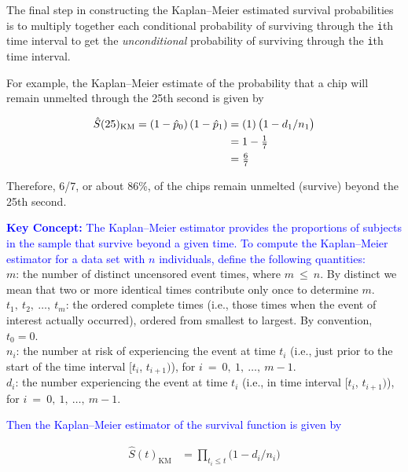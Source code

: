 \documentclass[
]{report}
\begin{document}
The final step in constructing the Kaplan--Meier estimated survival probabilities is to multiply together each conditional probability of surviving through the \texttt{i}th time interval to get the \emph{unconditional} probability of surviving through the \texttt{i}th time interval.

For example, the Kaplan--Meier estimate of the probability that a chip will remain unmelted through the 25th second is given by

\begin{align}
\hat S(25)_{\mathrm{KM}} = (1 - \hat p_0)\,(1 - \hat p_1) &= (1)\,\bigl(1 - d_1/n_1\bigr) \notag \\
&= 1 - \tfrac{1}{7} \notag \\ 
&= \tfrac{6}{7} \notag
\end{align}

Therefore, 6/7, or about 86\%, of the chips remain unmelted (survive) beyond the 25th second.

\textbf{\textcolor{blue}{Key Concept:}}
\textcolor{blue}{The Kaplan–Meier estimator provides the proportions of subjects in the sample that survive beyond a given time. To compute the Kaplan–Meier estimator for a data set with $n$ individuals, define the following quantities:}\\
\(\scriptstyle m\): the number of distinct uncensored event times, where \(\scriptstyle m \  \le \ n\). By distinct we mean that two or more identical times contribute only once to determine \(m\).\\
\(\scriptstyle t_1, \ t_2,\  \dots,\  t_m\): the ordered complete times (i.e., those times when the event of interest actually occurred), ordered from smallest to largest. By convention, \(t_0 = 0\).\\
\(\scriptstyle n_i\): the number at risk of experiencing the event at time \(\scriptstyle t_i\) (i.e., just prior to the start of the time interval {[}\(\scriptstyle t_i\), \(\scriptstyle t_{i+1})\)), for \(\scriptstyle i \ =\  0,\ 1,\ \dots,\ m-1\).\\
\(\scriptstyle d_i\): the number experiencing the event at time \(\scriptstyle t_i\) (i.e., in time interval {[}\(\scriptstyle t_i\), \(\scriptstyle t_{i+1})\)), for \(\scriptstyle i \ =\  0,\ 1,\ \dots,\ m-1\).

\textcolor{blue}{Then the Kaplan–Meier estimator of the survival function is given by}

\begin{align}\label{9.2}
\hat S(t)_{\mathrm{KM}} &= \prod_{t_i \le t} \bigl(1 - d_i/n_i\bigr)
\tag{7.2}
\end{align}
\end{document}

